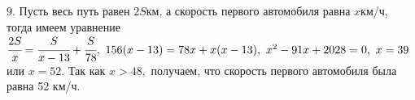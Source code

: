 9. Пусть весь путь равен $2S$км, а скорость первого автомобиля равна $x$км/ч, тогда имеем уравнение $\cfrac{2S}{x}=\cfrac{S}{x-13}+\cfrac{S}{78},\
156(x-13)=78x+x(x-13),\ x^2-91x+2028=0,\ x=39$ или $x=52.$ Так как $x>48,$ получаем, что скорость первого автомобиля была равна 52 км/ч.\\
